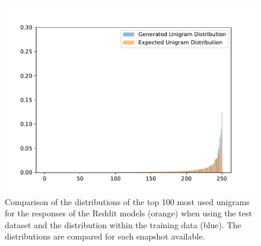 \begin{figure}[H]
  \centering
  \small
  \endminipage\hfill
  \includegraphics[width=\linewidth]{img/plots/reddit/unigram_distribution_comparison_step_3000000.pdf}
  \centering
  \small
  \endminipage\hfill
  \caption{Comparison of the distributions of the top 100 most used unigrams for the responses of the Reddit models (orange) when using the test dataset and the distribution within the training data (blue). The distributions are compared for each snapshot available.}
  \label{results:unigram:distributions:reddit}
\end{figure}